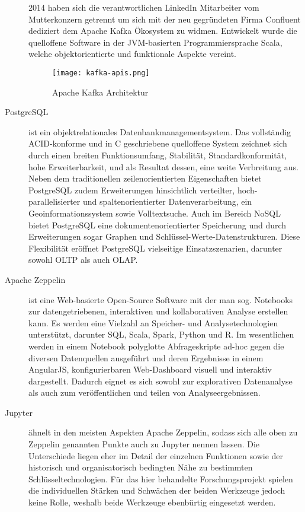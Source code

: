 \begin{description}
	2014 haben sich die verantwortlichen LinkedIn Mitarbeiter vom Mutterkonzern getrennt um sich mit der neu gegründeten Firma Confluent dediziert dem Apache Kafka Ökosystem zu widmen. Entwickelt wurde die quelloffene Software in der JVM-basierten Programmiersprache Scala, welche objektorientierte und funktionale Aspekte vereint.\autocite{kafka.apache} \autocite{wikiKafka} 
	\begin{figure}[h]
		\centering
		\texttt{[image: kafka-apis.png]}
		\caption[Apache Kafka Architektur]{Apache Kafka Architektur\autocite{kafka.apache}}
		\label{fig:KafkaArchitecture}
	\end{figure}
	\item [PostgreSQL] ist ein objektrelationales Datenbankmanagementsystem. Das vollständig ACID-konforme und in C geschriebene quelloffene System zeichnet sich durch einen breiten Funktionsumfang, Stabilität, Standardkonformität, hohe Erweiterbarkeit, und als Resultat dessen, eine weite Verbreitung aus. Neben dem traditionellen zeilenorientierten  Eigenschaften bietet PostgreSQL zudem Erweiterungen hinsichtlich verteilter, hoch-parallelisierter und  spaltenorientierter Datenverarbeitung, ein Geoinformationssystem sowie Volltextsuche. Auch im Bereich NoSQL bietet PostgreSQL eine dokumentenorientierter Speicherung und durch Erweiterungen sogar Graphen und Schlüssel-Werte-Datenstrukturen. Diese Flexibilität eröffnet PostgreSQL vielseitige Einsatzszenarien, darunter sowohl OLTP als auch OLAP.\autocite{wikiPostgres}
	\item [Apache Zeppelin] ist eine Web-basierte Open-Source Software mit der man sog. Notebooks zur datengetriebenen, interaktiven und kollaborativen Analyse erstellen kann. Es werden eine Vielzahl an Speicher- und Analysetechnologien unterstützt, darunter SQL, Scala, Spark, Python und R. Im wesentlichen werden in einem Notebook polyglotte Abfrageskripte ad-hoc gegen die diversen Datenquellen ausgeführt und deren Ergebnisse in einem AngularJS, konfigurierbaren Web-Dashboard visuell und interaktiv dargestellt. Dadurch eignet es sich sowohl zur explorativen Datenanalyse als auch zum veröffentlichen und teilen von Analyseergebnissen.\autocite{zeppelin.apache}
	\item [Jupyter] ähnelt in den meisten Aspekten Apache Zeppelin, sodass sich alle oben zu Zeppelin genannten Punkte auch zu Jupyter nennen lassen. Die Unterschiede liegen eher im Detail der einzelnen Funktionen sowie der historisch und organisatorisch bedingten Nähe zu bestimmten Schlüsseltechnologien.\autocite{jupyter.org} Für das hier behandelte Forschungsprojekt spielen die individuellen Stärken und Schwächen der beiden Werkzeuge jedoch keine Rolle, weshalb beide Werkzeuge ebenbürtig eingesetzt werden.\autocite{linkedinComparison}

\end{description}
